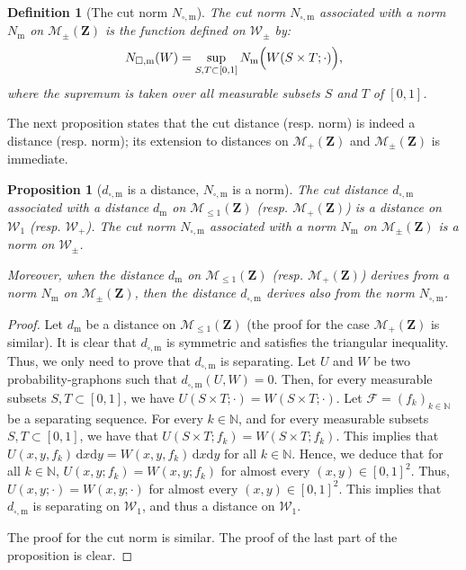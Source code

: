 \documentclass{amsart}
\theoremstyle{plain}
\newtheorem{prop}[Th]{Proposition}
\newtheorem{defin}[Th]{Definition}
\theoremstyle{definition}
\newcommand{\Space}{\mathbf{Z}}
\newcommand{\signed}{\pm}
\newcommand{\SubProba}{\mathcal{M}_{\leq1}(\Space)}
\newcommand{\Meas}{\mathcal{M}_+(\Space)}
\newcommand{\SignedMeas}{\mathcal{M}_{\pm}(\Space)}
\newcommand{\Graphon}{\mathcal{W}_1}
\newcommand{\Kernel}{\mathcal{W}_{\signed}}
\newcommand{\Kernelp}{\mathcal{W}_{+}}
\newcommand{\m}{\mathrm{m}}
\newcommand{\dmeas}{d_\m}
\newcommand{\NmeasLLarge}[1]{N_\m\Bigl(#1\Bigr)}
\newcommand{\NmeasSymbol}{N_\m}
\newcommand{\dcut}{d_{\square,\m}}
\newcommand{\Ncut}[1]{N_{\square,\m}(#1)}
\newcommand{\NcutSymbol}{N_{\square,\m}}
\newcommand{\F}{\mathcal{F}}
\newcommand{\N}{\mathbb{N}}
\newcommand{\rd}{\mathrm{d}}
\begin{document}
\begin{defin}[The cut norm $\NcutSymbol$]
The \emph{cut norm} $\NcutSymbol$ associated with a norm $\NmeasSymbol$ on
$\SignedMeas$ is the function  defined on $\Kernel$ by:
\begin{equation*}%
\Ncut{W} = \sup_{S,T\subset [0,1]} 
\NmeasLLarge{W(S\times T;\cdot)}   ,
\end{equation*}
where the supremum is taken over all  measurable subsets $S$ and $T$ of $[0,1]$.
\end{defin}

The next proposition states that the cut distance (resp. norm) is indeed
a distance (resp. norm); its extension to distances on $\Meas$ and
$\SignedMeas$ is immediate. 


\begin{prop}[$\dcut$ is a distance, $\NcutSymbol$ is a norm]
  The cut distance $\dcut$ associated with a distance $\dmeas$ on
  $\SubProba$ (resp. $\Meas$) is a distance on $\Graphon$ (resp. $\Kernelp$).
  The cut norm $\NcutSymbol$ associated with a
  norm $\NmeasSymbol$ on  $\SignedMeas$ is a norm on $\Kernel$.

Moreover, when the distance $\dmeas$ on $\SubProba$ (resp. $\Meas$)
derives from a norm $\NmeasSymbol$ on $\SignedMeas$,
then the distance $\dcut$ derives also from the norm $\NcutSymbol$.
\end{prop}


\begin{proof}
  Let $\dmeas$ be  a distance on $\SubProba$
  	(the proof for the case $\Meas$ is similar).
  It is  clear that $\dcut$ is symmetric and  satisfies the triangular inequality.   
  Thus, we only need to  prove that  $\dcut$ is  separating.  
  Let $U$  and $W$  be two probability-graphons  
  	such that $\dcut(U,W)  = 0$.  Then,  for every
  	measurable     subsets     $S,     T\subset    [0,1]$,     
	we     have $U(S\times T;\cdot)  =   W(S\times T;\cdot)$.   
  Let  $\F=(f_k  )_{k\in\N}$  be  a separating  sequence.  
  For  every $k\in\N$, and for     every    measurable     subsets    
  	$S,     T\subset    [0,1]$, we have that $U(S\times T;f_k) = W(S\times T;f_k)$. This
        implies that  $U(x,y,f_k)\, \rd x\rd y= W(x,y,f_k)\, \rd x\rd y$ for all $k\in \N$. 
  Hence, we  deduce  that for all $k\in\N$, $U(x,y;f_k) =  W(x,y;f_k)$ 
  	for  almost every $(x,y)\in [0,1]^2$. 
  Thus, $U(x,y;\cdot) =  W(x,y;\cdot)$ 
  	for  almost every $(x,y)\in [0,1]^2$.
  This implies that $\dcut$ is separating on $\Graphon$, 
  	and thus a distance on $\Graphon$.

  The proof for the cut norm is similar. 
  The proof of the last part of the proposition is clear. 
\end{proof}
\end{document}
